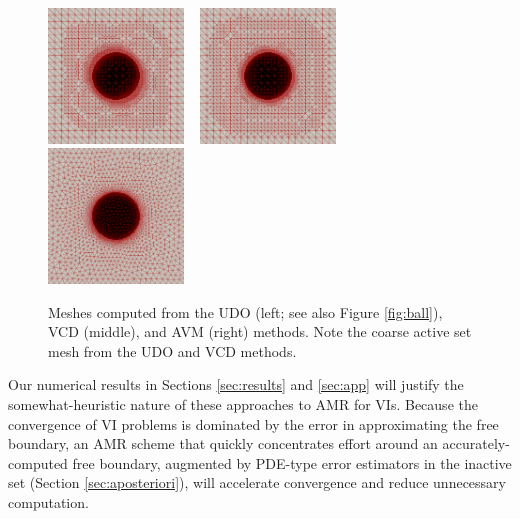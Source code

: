 \documentclass[]{interact}
\theoremstyle{plain}%
\theoremstyle{definition}
\theoremstyle{remark}
\begin{document}
\begin{figure}[ht]
\noindent \hspace{-1mm} \mbox{\includegraphics[width=0.32\textwidth]{static/sphereudo.png} \, \includegraphics[width=0.32\textwidth]{static/spherevcd.png} \,\,\includegraphics[width=0.32\textwidth]{static/sphereavm.png}}
\caption{Meshes computed from the UDO (left; see also Figure \ref{fig:ball}), VCD (middle), and AVM (right) methods.  Note the coarse active set mesh from the UDO and VCD methods.}
\label{fig:threeballmeshes}
\end{figure}

Our numerical results in Sections \ref{sec:results} and \ref{sec:app} will justify the somewhat-heuristic nature of these approaches to AMR for VIs.  Because the convergence of VI problems is dominated by the error in approximating the free boundary, an AMR scheme that quickly concentrates effort around an accurately-computed free boundary, augmented by PDE-type error estimators in the inactive set (Section \ref{sec:aposteriori}), will accelerate convergence and reduce unnecessary computation.
\end{document}
